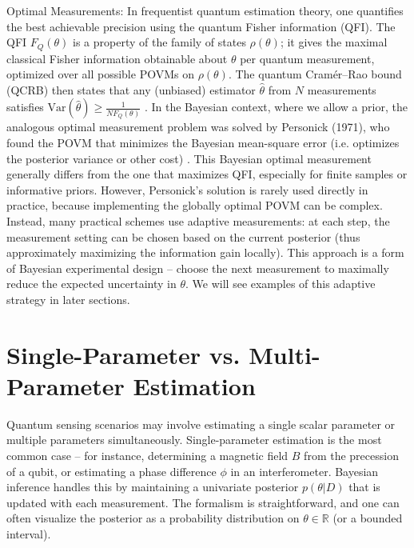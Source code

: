 Optimal Measurements: In frequentist quantum estimation theory, one
quantifies the best achievable precision using the quantum Fisher
information (QFI). The QFI $F_Q(\theta)$ is a property of the family
of states $\rho(\theta)$; it gives the maximal classical Fisher
information obtainable about $\theta$ per quantum measurement,
optimized over all possible POVMs on $\rho(\theta)$. The quantum
Cramér–Rao bound (QCRB) then states that any (unbiased) estimator
$\hat{\theta}$ from $N$ measurements satisfies
$\mathrm{Var}(\hat{\theta}) \ge \frac{1}{N F_Q(\theta)}$ . In the
Bayesian context, where we allow a prior, the analogous optimal
measurement problem was solved by Personick (1971), who found the POVM
that minimizes the Bayesian mean-square error (i.e. optimizes the
posterior variance or other cost) . This Bayesian optimal measurement
generally differs from the one that maximizes QFI, especially for
finite samples or informative priors. However, Personick’s solution is
rarely used directly in practice, because implementing the globally
optimal POVM can be complex. Instead, many practical schemes use
adaptive measurements: at each step, the measurement setting can be
chosen based on the current posterior (thus approximately maximizing
the information gain locally). This approach is a form of Bayesian
experimental design – choose the next measurement to maximally reduce
the expected uncertainty in $\theta$. We will see examples of this
adaptive strategy in later sections.



\section{Single-Parameter vs. Multi-Parameter Estimation}

Quantum sensing scenarios may involve estimating a single scalar
parameter or multiple parameters simultaneously. Single-parameter
estimation is the most common case – for instance, determining a
magnetic field $B$ from the precession of a qubit, or estimating a
phase difference $\phi$ in an interferometer. Bayesian inference
handles this by maintaining a univariate posterior $p(\theta|D)$ that
is updated with each measurement. The formalism is straightforward,
and one can often visualize the posterior as a probability
distribution on $\theta \in \mathbb{R}$ (or a bounded interval).



